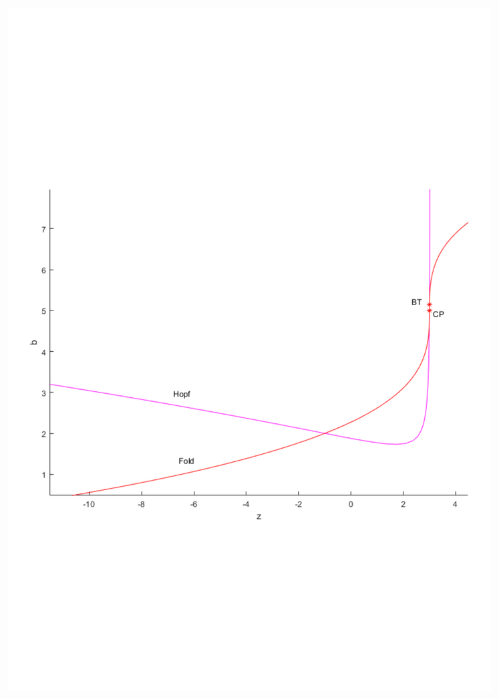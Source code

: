 \documentclass[presentation]{beamer}
\begin{document}
\begin{frame}[plain]
\begin{columns}
\begin{column}{0.5\columnwidth}
\begin{center}
\includegraphics[width=\textwidth]{HRzbBif.pdf}
\end{center}
\end{column}
\begin{column}{0.5\columnwidth}
\begin{center}

\end{center}
\end{column}
\end{columns}
\end{frame}
\end{document}
